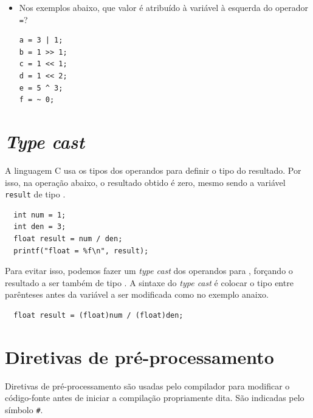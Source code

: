 \begin{itemize}

\item Nos exemplos abaixo, que valor é atribuído à variável à esquerda do operador {\tt =}?

\begin{lstlisting}
a = 3 | 1;
b = 1 >> 1;
c = 1 << 1;
d = 1 << 2;
e = 5 ^ 3;
f = ~ 0;
\end{lstlisting}

\end{itemize}

\section{\emph{Type cast}}

A linguagem C usa os tipos dos operandos para definir o tipo do resultado. Por isso, na operação abaixo, o resultado obtido é zero, mesmo sendo a variável {\tt result} de tipo \FLOAT.

\begin{lstlisting}
  int num = 1;
  int den = 3;
  float result = num / den;
  printf("float = %f\n", result);
\end{lstlisting}

Para evitar isso, podemos fazer um \textit{type cast} dos operandos para \FLOAT, forçando o resultado a ser também de tipo \FLOAT. A sintaxe do \textit{type cast} é colocar o tipo entre parênteses antes da variável a ser modificada como no exemplo anaixo.

\begin{lstlisting}
  float result = (float)num / (float)den;
\end{lstlisting}


\section{Diretivas de pré-processamento}

Diretivas de pré-processamento são usadas pelo compilador para modificar o código-fonte antes de iniciar a compilação propriamente dita. São indicadas pelo símbolo {\tt \#}.

